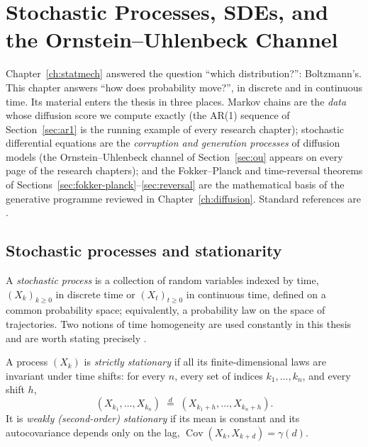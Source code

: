 \chapter{Stochastic Processes, SDEs, and the Ornstein--Uhlenbeck Channel}
\label{ch:stochproc}\label{ch:sde}

Chapter~\ref{ch:statmech} answered the question ``which distribution?'':
Boltzmann's. This chapter answers ``how does probability move?'', in
discrete and in continuous time. Its material enters the thesis in
three places. Markov chains are the \emph{data} whose diffusion score
we compute exactly (the AR(1) sequence of Section~\ref{sec:ar1} is the
running example of every research chapter); stochastic differential
equations are the \emph{corruption and generation processes} of diffusion
models (the Ornstein--Uhlenbeck channel of Section~\ref{sec:ou} appears
on every page of the research chapters); and the Fokker--Planck and
time-reversal theorems of
Sections~\ref{sec:fokker-planck}--\ref{sec:reversal} are the
mathematical basis of the generative programme reviewed in
Chapter~\ref{ch:diffusion}. Standard references are
\citet{robert2004monte, brockwell1991time, oksendal2003stochastic,
gardiner2009stochastic, risken1996fokker}.

\section{Stochastic processes and stationarity}\label{sec:stationarity}

A \emph{stochastic process} is a collection of random variables indexed
by time, $(X_k)_{k \geq 0}$ in discrete time or $(X_t)_{t \geq 0}$ in
continuous time, defined on a common probability space; equivalently, a
probability law on the space of trajectories. Two notions of time
homogeneity are used constantly in this thesis and are worth stating
precisely \citep{brockwell1991time}.

\begin{definition}\label{def:stationarity}
A process $(X_k)$ is \emph{strictly stationary} if all its
finite-dimensional laws are invariant under time shifts: for every $n$,
every set of indices $k_1, \dots, k_n$, and every shift $h$,
\begin{equation*}
  (X_{k_1}, \dots, X_{k_n})
  \;\stackrel{d}{=}\;
  (X_{k_1 + h}, \dots, X_{k_n + h}) .
\end{equation*}
It is \emph{weakly (second-order) stationary} if its mean is constant and
its autocovariance depends only on the lag,
$\operatorname{Cov}(X_k, X_{k+d}) = \gamma(d)$.
\end{definition}

